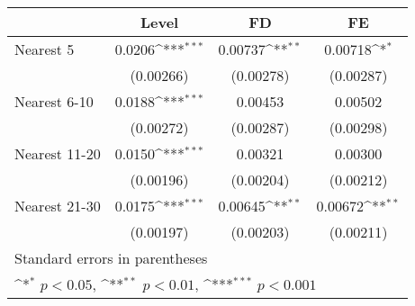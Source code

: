 {
\def\sym#1{\ifmmode^{#1}\else\(^{#1}\)\fi}
\begin{tabular}{l*{3}{c}}
\hline\hline
            &\multicolumn{1}{c}{Level}&\multicolumn{1}{c}{FD}&\multicolumn{1}{c}{FE}\\
\hline
Nearest 5   &      0.0206\sym{***}&     0.00737\sym{**} &     0.00718\sym{*}  \\
            &   (0.00266)         &   (0.00278)         &   (0.00287)         \\
[1em]
Nearest 6-10&      0.0188\sym{***}&     0.00453         &     0.00502         \\
            &   (0.00272)         &   (0.00287)         &   (0.00298)         \\
[1em]
Nearest 11-20&      0.0150\sym{***}&     0.00321         &     0.00300         \\
            &   (0.00196)         &   (0.00204)         &   (0.00212)         \\
[1em]
Nearest 21-30&      0.0175\sym{***}&     0.00645\sym{**} &     0.00672\sym{**} \\
            &   (0.00197)         &   (0.00203)         &   (0.00211)         \\
\hline\hline
\multicolumn{4}{l}{\footnotesize Standard errors in parentheses}\\
\multicolumn{4}{l}{\footnotesize \sym{*} \(p<0.05\), \sym{**} \(p<0.01\), \sym{***} \(p<0.001\)}\\
\end{tabular}
}
